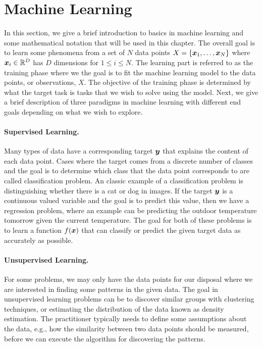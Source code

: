 \section{Machine Learning} 
\label{sec:machine_learning}

In this section, we give a brief introduction to basics in machine learning and some mathematical notation that will be used in this chapter. The overall goal is to learn some phenomena from a set of $N$ data points $X = \{{\bm{x}}_1, \dots, {\bm{x}}_N\}$ where ${\bm{x}}_i \in \mathbb{R}^{D}$ has $D$ dimensions for $1 \leq i \leq N$. The learning part is referred to as the training phase where we the goal is to fit the machine learning model to the data points, or observations, $X$. The objective of the training phase is determined by what the target task is tasks that we wish to solve using the model. Next, we give a brief description of three paradigms in machine learning with different end goals depending on what we wish to explore.

\paragraph{Supervised Learning.} Many types of data have a corresponding target ${\bm{y}}$ that explains the content of each data point. Cases where the target comes from a discrete number of classes and the goal is to determine which class that the data point corresponds to are called classification problem. An classic example of a classification problem is distinguishing whether there is a cat or dog in images. If the target ${\bm{y}}$ is a continuous valued variable and the goal is to predict this value, then we have a regression problem, where an example can be predicting the outdoor temperature tomorrow given the current temperature. The goal for both of these problems is to learn a function $f({\bm{x}})$ that can classify or predict the given target data as accurately as possible. 

\paragraph{Unsupervised Learning.} For some problems, we may only have the data points for our disposal where we are interested in finding some patterns in the given data. The goal in unsupervised learning problems can be to discover similar groups with clustering techniques, or estimating the distribution of the data known as density estimation. The practitioner typically needs to define some assumptions about the data, e.g., how the similarity between two data points should be measured, before we can execute the algorithm for discovering the patterns. 


